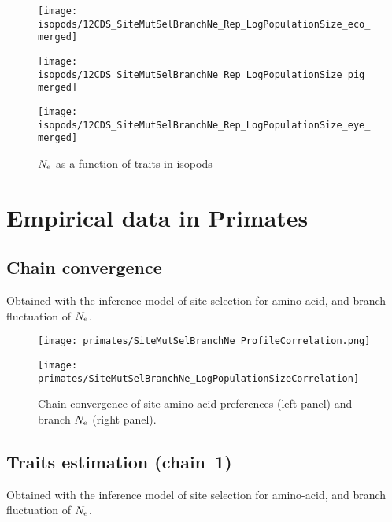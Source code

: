 \begin{figure}[H]
    \centering
    \begin{minipage}{0.32\linewidth}
        \texttt{[image: isopods/12CDS\_SiteMutSelBranchNe\_Rep\_LogPopulationSize\_eco\_merged]}
    \end{minipage} \hfill
    \begin{minipage}{0.32\linewidth}
        \texttt{[image: isopods/12CDS\_SiteMutSelBranchNe\_Rep\_LogPopulationSize\_pig\_merged]}
    \end{minipage} \hfill
    \begin{minipage}{0.32\linewidth}
        \texttt{[image: isopods/12CDS\_SiteMutSelBranchNe\_Rep\_LogPopulationSize\_eye\_merged]}
    \end{minipage}
    \caption[$\Ne$ as a function of traits in isopods]{$\Ne$ as a function of traits in isopods}
\end{figure}


\section{Empirical data in Primates}
\label{sec:empirical-data-in-primates}

\subsection{Chain convergence}
Obtained with the inference model of site selection for amino-acid, and branch fluctuation of $\Ne$.

\begin{figure}[H]
    \centering
    \begin{minipage}{0.49\linewidth}
        \texttt{[image: primates/SiteMutSelBranchNe\_ProfileCorrelation.png]}
    \end{minipage} \hfill
    \begin{minipage}{0.49\linewidth}
        \texttt{[image: primates/SiteMutSelBranchNe\_LogPopulationSizeCorrelation]}
    \end{minipage}
    \caption[Chain convergence of site profiles and branche $\Ne$]{
    Chain convergence of site amino-acid preferences (left panel) and branch $\Ne$ (right panel).}
\end{figure}

\subsection{Traits estimation (chain~1)}
Obtained with the inference model of site selection for amino-acid, and branch fluctuation of $\Ne$.

